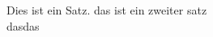 \documentclass[a4paper, 11pt]{article}
\begin{document}
Dies ist ein Satz.
%
das ist ein zweiter satz \\
%
dasdas

\end{document}
